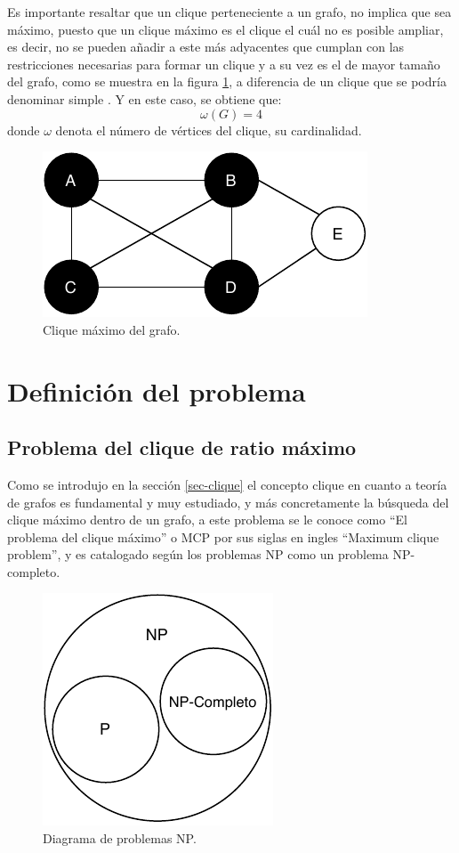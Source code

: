 Es importante resaltar que un clique perteneciente a un grafo, no implica que sea máximo, puesto que un clique máximo es el clique el cuál no es posible ampliar, es decir, no se pueden añadir a este más adyacentes que cumplan con las restricciones necesarias para formar un clique y a su vez es el de mayor tamaño del grafo, como se muestra en la figura \ref{fig:max-clique}, a diferencia de un clique que se podría denominar simple  \cite{web-maximalclique}\cite{web-maximumclique}. Y en este  caso, se obtiene que:
\[
\omega(G) = 4
\]
donde $\omega$ denota el número de vértices del clique, su cardinalidad.
\begin{figure}[H]
	\centering
	\includegraphics{Figures/graph-clique-max.pdf}
	\caption{Clique máximo del grafo.}
	\label{fig:max-clique}
\end{figure}

\section{Definición del problema}

\subsection{Problema del clique de ratio máximo}
\label{intro-problema}
Como se introdujo en la sección \ref{sec-clique} el concepto clique en cuanto a teoría de grafos es fundamental y muy estudiado, y más concretamente la búsqueda del clique máximo dentro de un grafo, a este problema se le conoce como ``El problema del clique máximo'' o \gls{MCP} por sus siglas en ingles ``Maximum clique problem'', y es catalogado según los problemas NP como un problema NP-completo.

\begin{figure}[H]
	\centering
	\includegraphics{Figures/problemas-np.pdf}
	\caption{Diagrama de problemas NP.}
	\label{fig:problemas-np}
\end{figure}

